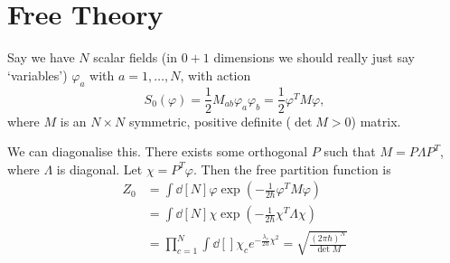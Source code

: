 \section{Free Theory}%
\label{sec:free_theory}

Say we have $N$ scalar fields (in $0+1$ dimensions we should really just say `variables') $\varphi_{a}$ with $a = 1, \dots, N$, with action
\begin{equation}
  S_0 (\varphi) = \frac{1}{2} M_{ab} \varphi_{a} \varphi_{b} = \frac{1}{2} \varphi^T M \varphi,
\end{equation}
where $M$ is an $N \times N$ symmetric, positive definite ($\det M > 0$) matrix.

We can diagonalise this. There exists some orthogonal $P$ such that $M = P \Lambda P^T$, where $\Lambda$ is diagonal.
Let $\chi = P^T \varphi$. Then the free partition function is
\begin{align}
  Z_0 &= \int \dd[N]{\varphi} \exp(-\frac{1}{2 \hbar} \varphi^T M \varphi) \\
      &= \int \dd[N]{\chi} \exp(- \frac{1}{2 \hbar} \chi^T \Lambda \chi) \\
      &= \prod_{c=1}^N \int \dd[]{\chi_c} e^{-\frac{\lambda_c}{2 \hbar} \chi^2} = \sqrt{\frac{(2 \pi \hbar)^N}{\det M}}
\end{align}

